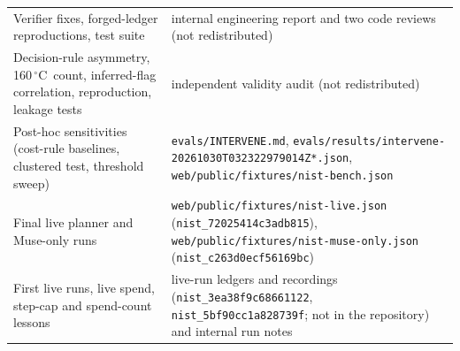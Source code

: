 \documentclass[11pt]{article}
\newcommand{\cmd}[1]{\texttt{#1}}
\newcommand{\degC}{\,$^\circ$C}
\begin{document}
\begin{table}[h]
\begin{tabular}{@{}>{\raggedright\arraybackslash}p{5.6cm}>{\raggedright\arraybackslash}p{10.2cm}@{}}
Verifier fixes, forged-ledger reproductions, test suite & internal engineering report and two code reviews (not redistributed) \\
Decision-rule asymmetry, 160\degC\ count, inferred-flag correlation, reproduction, leakage tests & independent validity audit (not redistributed) \\
Post-hoc sensitivities (cost-rule baselines, clustered test, threshold sweep) & \cmd{evals/INTERVENE.md}, \cmd{evals/results/intervene-20261030T032322979014Z*.json}, \cmd{web/public/fixtures/nist-bench.json} \\
Final live planner and Muse-only runs & \cmd{web/public/fixtures/nist-live.json} (\texttt{nist\_72025414c3adb815}), \cmd{web/public/fixtures/nist-muse-only.json} (\texttt{nist\_c263d0ecf56169bc}) \\
First live runs, live spend, step-cap and spend-count lessons & live-run ledgers and recordings (\texttt{nist\_3ea38f9c68661122}, \texttt{nist\_5bf90cc1a828739f}; not in the repository) and internal run notes \\
\bottomrule
\end{tabular}
\end{table}
\end{document}
